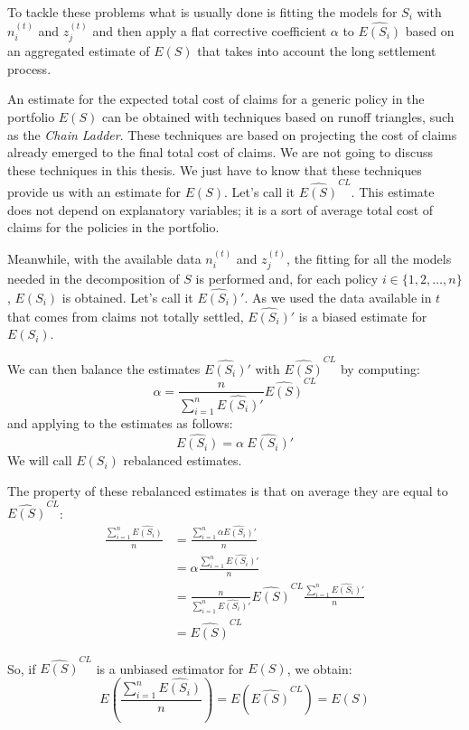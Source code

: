 \documentclass[a4paper, nobind]{templates/ociamthesis}
\theoremstyle{definition}
\theoremstyle{definition}
\theoremstyle{definition}
\theoremstyle{remark}
\begin{document}
To tackle these problems what is usually done is fitting the models for \(S_i\) with \(n_i^{(t)}\) and \(z_j^{(t)}\) and then apply a flat corrective coefficient \(\alpha\) to \(\widehat{E(S_i)}\) based on an aggregated estimate of \(E(S)\) that takes into account the long settlement process.

An estimate for the expected total cost of claims for a generic policy in the portfolio \(E(S)\) can be obtained with techniques based on runoff triangles, such as the \emph{Chain Ladder}. These techniques are based on projecting the cost of claims already emerged to the final total cost of claims. We are not going to discuss these techniques in this thesis. We just have to know that these techniques provide us with an estimate for \(E(S)\). Let's call it \(\widehat{E(S)}^{CL}\). This estimate does not depend on explanatory variables; it is a sort of average total cost of claims for the policies in the portfolio.

Meanwhile, with the available data \(n_i^{(t)}\) and \(z_j^{(t)}\), the fitting for all the models needed in the decomposition of \(S\) is performed and, for each policy \(i\in\{1, 2, \dots, n\}\), \(E(S_i)\) is obtained. Let's call it \(\widehat{E(S_i)}'\). As we used the data available in \(t\) that comes from claims not totally settled, \(\widehat{E(S_i)}'\) is a biased estimate for \(E(S_i)\).

We can then balance the estimates \(\widehat{E(S_i)}'\) with \(\widehat{E(S)}^{CL}\) by computing:
\[
\alpha = \frac{n}{\sum_{i=1}^{n}{\widehat{E(S_i)}'}} \widehat{E(S)}^{CL}
\]
and applying to the estimates as follows:
\[
\widehat{E(S_i)} = \alpha \ \widehat{E(S_i)}'
\]
We will call \(\widehat{E(S_i)}\) rebalanced estimates.

The property of these rebalanced estimates is that on average they are equal to \(\widehat{E(S)}^{CL}\):
\begin{align*}
\frac{\sum_{i=1}^{n}{\widehat{E(S_i)}}}{n} & = \frac{\sum_{i=1}^{n}{\alpha\widehat{E(S_i)}'}}{n} \\
& = \alpha\frac{\sum_{i=1}^{n}{\widehat{E(S_i)}'}}{n} \\
& = \frac{n}{\sum_{i=1}^{n}{\widehat{E(S_i)}'}} \widehat{E(S)}^{CL} \frac{\sum_{i=1}^{n}{\widehat{E(S_i)}'}}{n} \\
& = \widehat{E(S)}^{CL}
\end{align*}

So, if \(\widehat{E(S)}^{CL}\) is a unbiased estimator for \(E(S)\), we obtain:
\[
E\left( \frac{\sum_{i=1}^{n}{\widehat{E(S_i)}}}{n} \right)
= E\left( \widehat{E(S)}^{CL} \right)
= E(S)
\]
\end{document}
